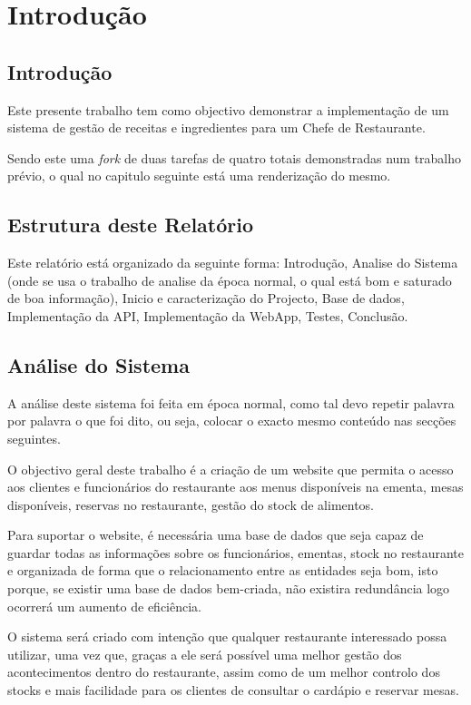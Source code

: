 \chapter{Introdução}

\section{Introdução}

Este presente trabalho tem como objectivo demonstrar a implementação de um sistema de gestão de receitas e ingredientes para um Chefe de Restaurante.

Sendo este uma \textit{fork} de duas tarefas de quatro totais demonstradas num trabalho prévio, o qual no capitulo seguinte está uma renderização do mesmo.

\section{Estrutura deste Relatório}

Este relatório está organizado da seguinte forma: Introdução, Analise do Sistema (onde se usa o trabalho de analise da época normal, o qual está bom e saturado de boa informação), Inicio e caracterização do Projecto, Base de dados, Implementação da API, Implementação da WebApp, Testes, Conclusão.

\section{Análise do Sistema}

A análise deste sistema foi feita em época normal, como tal devo repetir palavra por palavra o que foi dito, ou seja, colocar o exacto mesmo conteúdo nas secções seguintes.

O objectivo geral deste trabalho é a criação de um website que permita o acesso aos clientes e funcionários do restaurante aos menus disponíveis na ementa, mesas disponíveis, reservas no restaurante, gestão do stock de alimentos.

Para suportar o website, é necessária uma base de dados que seja capaz de guardar todas as informações sobre os funcionários, ementas, stock no restaurante e organizada de forma que o relacionamento entre as entidades seja bom, isto porque, se existir uma base de dados bem-criada, não existira redundância logo ocorrerá um aumento de eficiência.

O sistema será criado com intenção que qualquer restaurante interessado possa utilizar, uma vez que, graças a ele será possível uma melhor gestão dos acontecimentos dentro do restaurante, assim como de um melhor controlo dos stocks e mais facilidade para os clientes de consultar o cardápio e reservar mesas.

